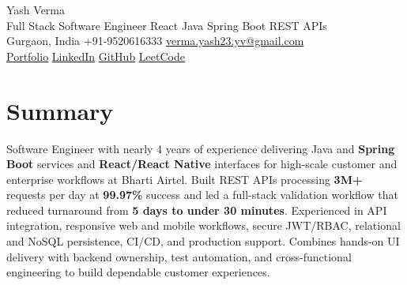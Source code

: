 \documentclass[letterpaper,11pt]{article}
\begin{document}
\begin{center}
  {\Huge Yash Verma} \\
  \small Full Stack Software Engineer \textperiodcentered{} React \textperiodcentered{} Java \textperiodcentered{} Spring Boot \textperiodcentered{} REST APIs \\
  \vspace{5pt}
  \small Gurgaon, India \textbar{} +91-9520616333 \textbar{}
  \href{mailto:verma.yash23.yv@gmail.com}{verma.yash23.yv@gmail.com} \\
  \vspace{7pt}
  \href{https://yashverma230600.github.io/yash-portfolio/}{Portfolio} \textbar{}
  \href{https://www.linkedin.com/in/yash-verma-9243a7193/}{LinkedIn} \textbar{}
  \href{https://github.com/yashverma230600}{GitHub} \textbar{}
  \href{https://leetcode.com/yashverma230600}{LeetCode}
  \vspace{-8pt}
\end{center}

\section{Summary}
\begin{itemize}[leftmargin=0.15in, label={}]
  \small{\item{
    Software Engineer with nearly 4 years of experience delivering Java and \textbf{Spring Boot} services and \textbf{React/React Native} interfaces for high-scale customer and enterprise workflows at Bharti Airtel. Built REST APIs processing \textbf{3M+} requests per day at \textbf{99.97\%} success and led a full-stack validation workflow that reduced turnaround from \textbf{5 days to under 30 minutes}. Experienced in API integration, responsive web and mobile workflows, secure JWT/RBAC, relational and NoSQL persistence, CI/CD, and production support. Combines hands-on UI delivery with backend ownership, test automation, and cross-functional engineering to build dependable customer experiences.
  }}
\end{itemize}
\vspace{-8pt}

\end{document}
